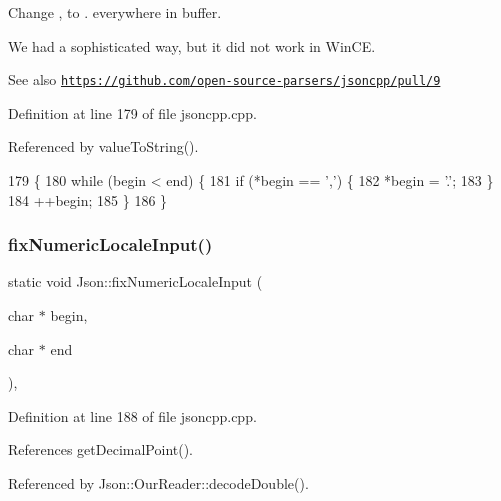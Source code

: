Change \textquotesingle{},\textquotesingle{} to \textquotesingle{}.\textquotesingle{} everywhere in buffer.

We had a sophisticated way, but it did not work in Win\+CE. \begin{DoxySeeAlso}{See also}
\href{https://github.com/open-source-parsers/jsoncpp/pull/9}{\tt https\+://github.\+com/open-\/source-\/parsers/jsoncpp/pull/9} 
\end{DoxySeeAlso}


Definition at line 179 of file jsoncpp.\+cpp.



Referenced by value\+To\+String().


\begin{DoxyCode}
179                                                             \{
180   \textcolor{keywordflow}{while} (begin < end) \{
181     \textcolor{keywordflow}{if} (*begin == \textcolor{charliteral}{','}) \{
182       *begin = \textcolor{charliteral}{'.'};
183     \}
184     ++begin;
185   \}
186 \}
\end{DoxyCode}
\mbox{\label{namespace_json_ac142c270507391c8d86f35b550d36eb4}} 
\subsubsection{\texorpdfstring{fix\+Numeric\+Locale\+Input()}{fixNumericLocaleInput()}}
{\footnotesize\ttfamily static void Json\+::fix\+Numeric\+Locale\+Input (\begin{DoxyParamCaption}\item[{char $\ast$}]{begin,  }\item[{char $\ast$}]{end }\end{DoxyParamCaption})\hspace{0.3cm}{\ttfamily [inline]}, {\ttfamily [static]}}



Definition at line 188 of file jsoncpp.\+cpp.



References get\+Decimal\+Point().



Referenced by Json\+::\+Our\+Reader\+::decode\+Double().



